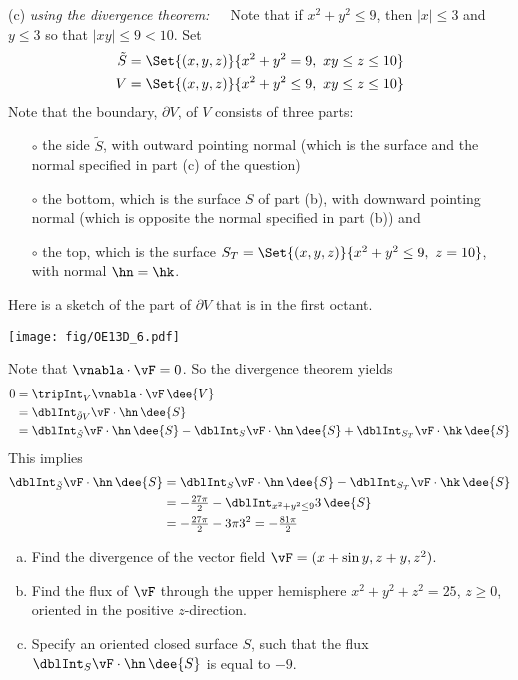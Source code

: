 \begin{solution}
\noindent (c) \emph{ using the divergence theorem:}\ \ \ 
Note that if $x^2+y^2\le 9$, then $|x|\le 3$ and $y\le 3$ so
that $|xy|\le 9<10$. Set
\begin{align*}
\tilde S&=\Set{(x,y,z)}{ x^2+y^2 = 9,\ xy\le z\le 10} \\
V&=\Set{(x,y,z)}{ x^2+y^2\le 9,\ xy\le z\le 10}
\end{align*}
Note that the boundary, $\partial V$,  of $V$ consists of three parts:
\begin{itemize}\itemsep1pt \parskip0pt \parsep0pt %
\item[$\circ$]
the side $\tilde S$, with outward pointing normal (which is the surface and
the normal specified in part (c) of the question)
\item[$\circ$]
the bottom, which is the surface $S$ of part (b), with downward pointing
normal (which is opposite the normal specified in part (b)) and 
\item[$\circ$]
the top, which is the surface $S_T=\Set{(x,y,z)}{x^2+y^2\le 9,\ z=10}$,
with normal $\hn=\hk$.
\end{itemize} 
Here is a sketch of the part of $\partial V$ that is in the first octant.

\begin{center}
       \texttt{[image: fig/OE13D\_6.pdf]}
\end{center}

\noindent
Note that $\vnabla\cdot\vF=0$. So the divergence theorem yields
\begin{align*}
0&=\tripInt_V \vnabla\cdot \vF\,\dee{V} \\
&=\dblInt_{\tilde \partial V} \vF\cdot\hn\,\dee{S} \\
&=\dblInt_{\tilde S} \vF\cdot\hn\,\dee{S}
   -\dblInt_{S} \vF\cdot\hn\,\dee{S}
   +\dblInt_{S_T} \vF\cdot\hk\,\dee{S} \\
\end{align*}
This implies
\begin{align*}
\dblInt_{\tilde S} \vF\cdot\hn\,\dee{S}
&=\dblInt_{S} \vF\cdot\hn\,\dee{S}
   -\dblInt_{S_T} \vF\cdot\hk\,\dee{S} \\
&=-\tfrac{27\pi}{2} -\dblInt_{x^2+y^2\le 9} 3\,\dee{S} \\
&= -\tfrac{27\pi}{2} -3 \pi 3^2
=-\tfrac{81\pi}{2}
\end{align*}
\end{solution}


\begin{question}[M317 2013D] %

\begin{enumerate}[(a)]
\item
Find the divergence of the vector field $\vF  = (x + \sin y, z + y, z^2)$.
\item
Find the flux of $\vF$ through the upper hemisphere $x^2 + y^2 + z^2 = 25$, 
$z \ge 0$, oriented in the positive $z$-direction.
\item
Specify an oriented closed surface $S$, such that the flux 
$\dblInt_S\vF \cdot\hn\,\dee{S}$ is equal to $-9$.
\end{enumerate}
\end{question}

